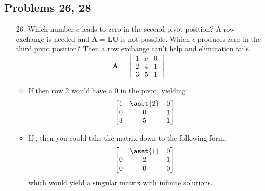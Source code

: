 \begin{itemize}
    \subsection{Problems 26, 28}
    \begin{enumerate}\color{foreground-2}
      \item[26.] Which number \(c\) leads to zero in the second pivot position? A row
        exchange is needed and \(\bm{A} = \bm{LU}\) is not possible. Which
        \(c\) produces zero in the third pivot position? Then a  row exchange
        can't help and elimination fails.
        \[%
        \bm{A} =
        \begin{bmatrix}
        1 & c & 0 \\
        2 & 4 & 1 \\
        3 & 5 & 1
        \end{bmatrix}
        \]%
        \begin{itemize}\color{foreground}
          \item If  then row 2 would have a 0 in the pivot, yielding:
            \[%
              \begin{bmatrix}
                1 & \aset{2} & 0 \\
                0 & 0 & 1 \\
                3 & 5 & 1
              \end{bmatrix}
            \]%

          \item If , then you could take the matrix down to the
            following form,
            \[%
              \begin{bmatrix}
                1 & \aset{1} & 0 \\
                0 & 2 & 1 \\
                0 & 0 & 0
              \end{bmatrix}
            \]%
            which would yield a singular matrix with infinite solutions.
        \end{itemize}


\end{enumerate}
\end{itemize}
